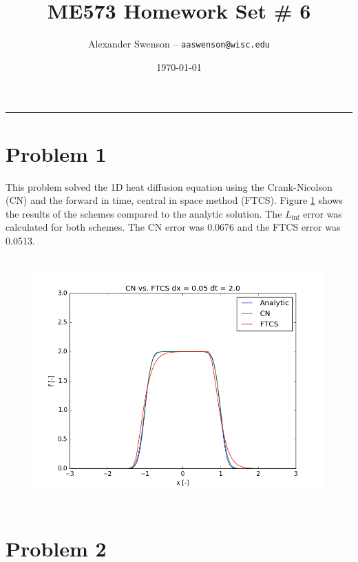 \documentclass[12pt]{article}
\title{ME573 Homework Set \# 6}
\author{Alexander Swenson -- \texttt{aaswenson@wisc.edu}}
\date{\today}
\begin{document}
  \maketitle

  \vspace{-0.3in}
  \noindent
  \rule{\linewidth}{0.4pt}

  \noindent
  

\section{Problem 1}

\noindent This problem solved the 1D heat diffusion equation using the Crank-Nicolson (CN) and the forward in time, central in space method (FTCS). Figure \ref{fig:problem1} shows the results of the schemes compared to the analytic solution. The $L_{\inf}$ error was calculated for both schemes. The CN error was 0.0676 and the FTCS error was 0.0513.

\begin{figure}[H]
	\centering
	\includegraphics[height=3.75in]{problem1.png}
	\label{fig:problem1}
\end{figure}





\section{Problem 2}
\end{document}

